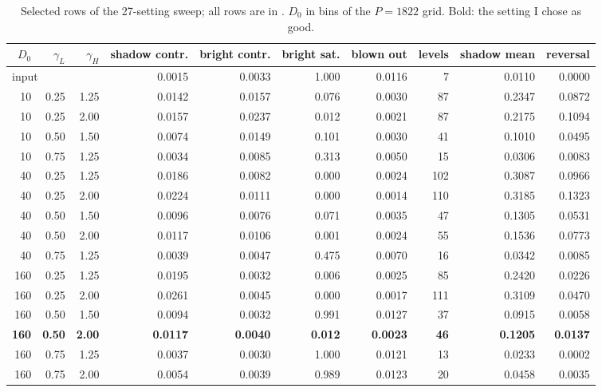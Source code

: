 \begin{table}[H]
\centering
\small
\begin{tabular}{rrrrrrrrrr}
\toprule
$D_0$ & $\gamma_L$ & $\gamma_H$ & shadow contr. & bright contr. & bright sat. & blown out & levels & shadow mean & reversal\\
\midrule
\multicolumn{3}{l}{input} & 0.0015 & 0.0033 & 1.000 & 0.0116 & 7 & 0.0110 & 0.0000\\
\midrule
10 & 0.25 & 1.25 & 0.0142 & 0.0157 & 0.076 & 0.0030 & 87 & 0.2347 & 0.0872\\
10 & 0.25 & 2.00 & 0.0157 & 0.0237 & 0.012 & 0.0021 & 87 & 0.2175 & 0.1094\\
10 & 0.50 & 1.50 & 0.0074 & 0.0149 & 0.101 & 0.0030 & 41 & 0.1010 & 0.0495\\
10 & 0.75 & 1.25 & 0.0034 & 0.0085 & 0.313 & 0.0050 & 15 & 0.0306 & 0.0083\\
40 & 0.25 & 1.25 & 0.0186 & 0.0082 & 0.000 & 0.0024 & 102 & 0.3087 & 0.0966\\
40 & 0.25 & 2.00 & 0.0224 & 0.0111 & 0.000 & 0.0014 & 110 & 0.3185 & 0.1323\\
40 & 0.50 & 1.50 & 0.0096 & 0.0076 & 0.071 & 0.0035 & 47 & 0.1305 & 0.0531\\
40 & 0.50 & 2.00 & 0.0117 & 0.0106 & 0.001 & 0.0024 & 55 & 0.1536 & 0.0773\\
40 & 0.75 & 1.25 & 0.0039 & 0.0047 & 0.475 & 0.0070 & 16 & 0.0342 & 0.0085\\
160 & 0.25 & 1.25 & 0.0195 & 0.0032 & 0.006 & 0.0025 & 85 & 0.2420 & 0.0226\\
160 & 0.25 & 2.00 & 0.0261 & 0.0045 & 0.000 & 0.0017 & 111 & 0.3109 & 0.0470\\
160 & 0.50 & 1.50 & 0.0094 & 0.0032 & 0.991 & 0.0127 & 37 & 0.0915 & 0.0058\\
\textbf{160} & \textbf{0.50} & \textbf{2.00} & \textbf{0.0117} & \textbf{0.0040} & \textbf{0.012} & \textbf{0.0023} & \textbf{46} & \textbf{0.1205} & \textbf{0.0137}\\
160 & 0.75 & 1.25 & 0.0037 & 0.0030 & 1.000 & 0.0121 & 13 & 0.0233 & 0.0002\\
160 & 0.75 & 2.00 & 0.0054 & 0.0039 & 0.989 & 0.0123 & 20 & 0.0458 & 0.0035\\
\bottomrule
\end{tabular}
\caption{Selected rows of the 27-setting sweep; all rows are in
. $D_0$ in bins of the $P=1822$ grid. Bold: the
setting I chose as good.}
\label{tab:sweep}
\end{table}

